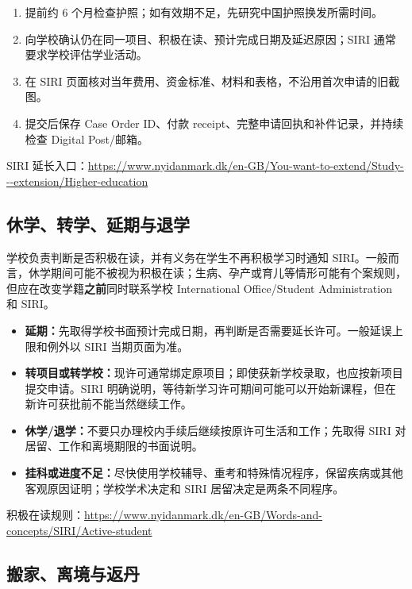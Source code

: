 \begin{enumerate}[leftmargin=2.2em,itemsep=3pt]
  \item 提前约 6 个月检查护照；如有效期不足，先研究中国护照换发所需时间。
  \item 向学校确认仍在同一项目、积极在读、预计完成日期及延迟原因；SIRI 通常要求学校评估学业活动。
  \item 在 SIRI 页面核对当年费用、资金标准、材料和表格，不沿用首次申请的旧截图。
  \item 提交后保存 Case Order ID、付款 receipt、完整申请回执和补件记录，并持续检查 Digital Post/邮箱。
\end{enumerate}

SIRI 延长入口：\url{https://www.nyidanmark.dk/en-GB/You-want-to-extend/Study---extension/Higher-education}

\subsection{休学、转学、延期与退学}

学校负责判断是否积极在读，并有义务在学生不再积极学习时通知 SIRI。一般而言，休学期间可能不被视为积极在读；生病、孕产或育儿等情形可能有个案规则，但应在改变学籍\textbf{之前}同时联系学校 International Office/Student Administration 和 SIRI。

\begin{itemize}[leftmargin=2em,itemsep=3pt]
  \item \textbf{延期：}先取得学校书面预计完成日期，再判断是否需要延长许可。一般延误上限和例外以 SIRI 当期页面为准。
  \item \textbf{转项目或转学校：}现许可通常绑定原项目；即使获新学校录取，也应按新项目提交申请。SIRI 明确说明，等待新学习许可期间可能可以开始新课程，但在新许可获批前不能当然继续工作。
  \item \textbf{休学/退学：}不要只办理校内手续后继续按原许可生活和工作；先取得 SIRI 对居留、工作和离境期限的书面说明。
  \item \textbf{挂科或进度不足：}尽快使用学校辅导、重考和特殊情况程序，保留疾病或其他客观原因证明；学校学术决定和 SIRI 居留决定是两条不同程序。
\end{itemize}

积极在读规则：\url{https://www.nyidanmark.dk/en-GB/Words-and-concepts/SIRI/Active-student}

\subsection{搬家、离境与返丹}

